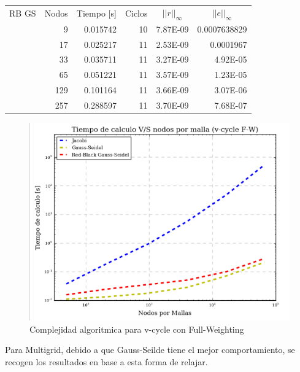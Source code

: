 \documentclass[letter,10pt]{article}
\begin{document}
\begin{table}[H]
\begin{tabular}[t]{|l|r|r|r|r|r|}
\multicolumn{ 1}{|c|}{RB GS} & \multicolumn{1}{l|}{Nodos} & \multicolumn{1}{l|}{Tiempo [s]}& \multicolumn{1}{l|}{Ciclos} & \multicolumn{1}{c|}{$||r||_{\infty}$} & \multicolumn{1}{c|}{$||e||_{\infty}$} \\ \cline{ 2- 6}
\multicolumn{ 1}{|l|}{} &9 & 0.015742 & 10 & 7.87E-09 & 0.0007638829 \\ \cline{ 2- 6}
\multicolumn{ 1}{|l|}{} & 17 & 0.025217 & 11 & 2.53E-09 & 0.0001967 \\ \cline{ 2- 6}
\multicolumn{ 1}{|l|}{} & 33 & 0.035711 & 11 & 3.27E-09 & 4.92E-05 \\ \cline{ 2- 6}
\multicolumn{ 1}{|l|}{} & 65 & 0.051221 & 11 & 3.57E-09 & 1.23E-05 \\ \cline{ 2- 6}
\multicolumn{ 1}{|l|}{} & 129 & 0.101164 & 11 & 3.66E-09 & 3.07E-06 \\ \cline{ 2- 6}
\multicolumn{ 1}{|l|}{} & 257 & 0.288597 & 11 & 3.70E-09 & 7.68E-07 \\ \hline
\end{tabular}
\label{resumenvcfw}
\end{table}

\begin{figure}
\centering
\includegraphics[scale=0.8]{img/tvsnvcfw}
\caption{Complejidad algoritmica para v-cycle con Full-Weighting}
\label{comtvsnvcfw}
\end{figure}

Para Multigrid, debido a que Gauss-Seilde tiene el mejor comportamiento, se recogen los resultados en base a esta forma de relajar.
\end{document}
